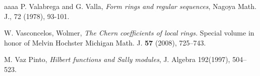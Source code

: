 \documentclass[reqno,a4paper,dvipsnames]{amsart}
\theoremstyle{definition}
\begin{document}
\begin{thebibliography}{aaaa}
  P. Valabrega and G. Valla, \textit{Form rings and regular sequences}, Nagoya Math. J., 72 (1978), 93-101.





W. Vasconcelos, Wolmer,
\textit{The Chern coefficients of local rings.}
Special volume in honor of Melvin Hochster
Michigan Math. J. {\bf 57} (2008), 725–743.

 M. Vaz Pinto, \textit{Hilbert functions and Sally modules}, J. Algebra 192(1997), 504–523.

  \end{thebibliography}
\end{document}
